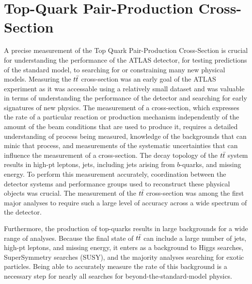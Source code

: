 %
%

\chapter{Top-Quark Pair-Production Cross-Section}

A precise measurement of the Top Quark Pair-Production Cross-Section is crucial for understanding the performance of the ATLAS detector, for testing predictions of the standard model, to searching for or constraining many new physical models.
Measuring the $t\bar{t}$ cross-section was an early goal of the ATLAS experiment as it was accessable using a relatively small dataset and was valuable in terms of understanding the performance of the detector and searching for early signatures of new physics.
The measurement of a cross-section, which expresses the rate of a particular reaction or production mechanism independently of the amount of the beam conditions that are used to produce it,
requires a detailed understanding of process being measured, knowledge of the backgrounds that can minic that process, and measurements of the systematic uncertainties that can influence the measurement of a cross-section.
The decay topology of the $t\bar{t}$ system results in high-pt leptons, jets, including jets arising from $b$-quarks, and missing energy.
To perform this measurement accurately, coordination between the detector systems and performance groups used to reconstruct these physical objects was crucial.
The measurement of the $t\bar{t}$ cross-section was among the first major analyses to require such a large level of accuracy across a wide spectrum of the detector. %

Furthermore, the production of top-quarks results in large backgrounds for a wide range of analyses.
Because the final state of $t\bar{t}$ can include a large number of jets, high-pt leptons, and missing energy, it enters as a background to Higgs searches, SuperSymmetry searches (SUSY),
and the majority analyses searching for exotic particles.
Being able to accurately measure the rate of this background is a necessary step for nearly all searches for beyond-the-standard-model physics.

